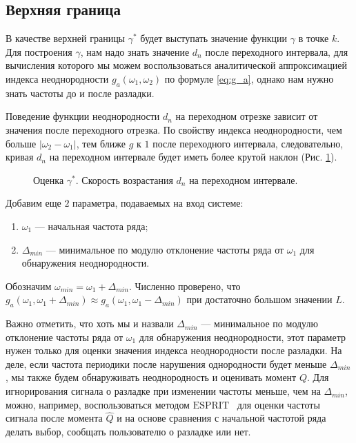 \documentclass[specialist, substylefile = spbu.rtx,
			   subf, href, 12pt]{disser}
\begin{document}
\subsection{Верхняя граница}\label{ch:apper_border}
В качестве верхней границы $ \gamma^* $ будет выступать значение функции $ \gamma $ в точке $ k $. Для построения $ \gamma $, нам надо знать значение $ d_n $ после переходного интервала, для вычисления которого мы можем воспользоваться аналитической аппроксимацией индекса неоднородности $ g_a(\omega_1, \omega_2) $ по формуле \eqref{eq:g_a}, однако нам нужно знать частоты до и после разладки.

Поведение функции неоднородности $ d_n $ на переходном отрезке зависит от значения после переходного отрезка. По свойству индекса неоднородности, чем больше $ |\omega_2 - \omega_1| $, тем ближе $ g $ к $ 1 $ после переходного интервала, следовательно, кривая $ d_n $ на переходном интервале будет иметь более крутой наклон (Рис. \ref{pic:diff_omega_growth}).

\begin{figure}[!hhh]
	\caption{Оценка $ \gamma^* $. Скорость возрастания $ d_n $ на переходном интервале.}
	\label{pic:diff_omega_growth}
\end{figure}

Добавим еще $ 2 $ параметра, подаваемых на вход системе:
\begin{enumerate}
	\item $ \omega_1 $ --- начальная частота ряда;
	\item $ \Delta_{min} $ --- минимальное по модулю отклонение частоты ряда от $ \omega_1 $ для обнаружения неоднородности.
\end{enumerate}

Обозначим $ \omega_{min} = \omega_1 + \Delta_{min}$. Численно проверено, что $ g_a(\omega_1, \omega_1 + \Delta_{min}) \approx g_a(\omega_1, \omega_1 - \Delta_{min}) $ при достаточно большом значении $ L $.

Важно отметить, что хоть мы и назвали $ \Delta_{min} $ --- минимальное по модулю отклонение частоты ряда от $ \omega_1 $ для обнаружения неоднородности, этот параметр нужен только для оценки значения индекса неоднородности после разладки. На деле, если частота периодики после нарушения однородности будет меньше $ \Delta_{min} $, мы также будем обнаруживать неоднородность и оценивать момент $ Q $. Для игнорирования сигнала о разладке при изменении частоты меньше, чем на $ \Delta_{min} $, можно, например, воспользоваться методом $ \mathrm{ESPRIT} $~\cite{epsrit} для оценки частоты сигнала после момента $ \hat{Q} $ и на основе сравнения с начальной частотой ряда делать выбор, сообщать пользователю о разладке или нет.
\end{document}
